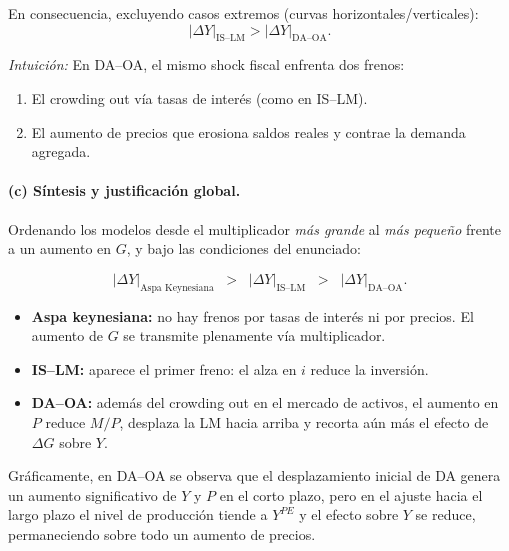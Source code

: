 \documentclass[11pt,addpoints]{article}
\begin{document}
En consecuencia, excluyendo casos extremos (curvas horizontales/verticales):
\[
\boxed{|\Delta Y|_{\text{IS--LM}} > |\Delta Y|_{\text{DA--OA}}.}
\]

\emph{Intuición:}  
En DA--OA, el mismo shock fiscal enfrenta dos frenos:
\begin{enumerate}
  \item El crowding out vía tasas de interés (como en IS--LM).
  \item El aumento de precios que erosiona saldos reales y contrae la demanda agregada.
\end{enumerate}

\medskip

\newpage
\vspace*{0.5cm}
\paragraph{(c) Síntesis y justificación global.}

Ordenando los modelos desde el multiplicador \emph{más grande} al \emph{más pequeño} frente a un aumento en $G$, y bajo las condiciones del enunciado:

\[
\boxed{
|\Delta Y|_{\text{Aspa Keynesiana}} 
\;\;>\;\; 
|\Delta Y|_{\text{IS--LM}} 
\;\;>\;\; 
|\Delta Y|_{\text{DA--OA}}.
}
\]

\begin{itemize}
  \item \textbf{Aspa keynesiana:} no hay frenos por tasas de interés ni por precios. El aumento de $G$ se transmite plenamente vía multiplicador.
  \item \textbf{IS--LM:} aparece el primer freno: el alza en $i$ reduce la inversión.
  \item \textbf{DA--OA:} además del crowding out en el mercado de activos, el aumento en $P$ reduce $M/P$, desplaza la LM hacia arriba y recorta aún más el efecto de $\Delta G$ sobre $Y$.
\end{itemize}

Gráficamente, en DA--OA se observa que el desplazamiento inicial de DA genera un aumento significativo de $Y$ y $P$ en el corto plazo, pero en el ajuste hacia el largo plazo el nivel de producción tiende a $Y^{PE}$ y el efecto sobre $Y$ se reduce, permaneciendo sobre todo un aumento de precios.
\end{document}
